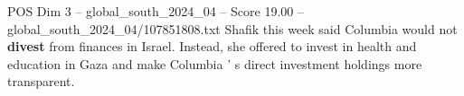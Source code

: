 \begin{textsample}{POS Dim 3 – global\_south\_2024\_04 – Score 19.00 – global\_south\_2024\_04/107851808.txt}
Shafik this week said Columbia would not \textbf{divest} from finances in Israel.
Instead, she offered to invest in health and education in Gaza and make Columbia ' s direct investment holdings more transparent.

\end{textsample}
